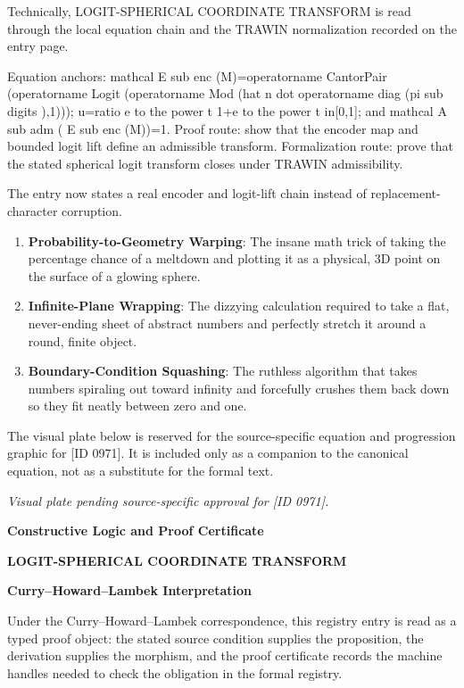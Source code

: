 Technically, LOGIT-SPHERICAL COORDINATE TRANSFORM is read through the local equation chain and the TRAWIN normalization recorded on the entry page.

Equation anchors: mathcal E sub enc (M)=operatorname CantorPair (operatorname Logit (operatorname Mod (hat n dot operatorname diag (pi sub digits ),1))); u=ratio e to the power t 1+e to the power t in[0,1]; and mathcal A sub adm ( E sub enc (M))=1. Proof route: show that the encoder map and bounded logit lift define an admissible transform. Formalization route: prove that the stated spherical logit transform closes under TRAWIN admissibility.

The entry now states a real encoder and logit-lift chain instead of replacement-character corruption.
\endgroup

\begin{enumerate}[leftmargin=1.6em,itemsep=6pt,topsep=4pt]
\item \textbf{Probability-to-Geometry Warping}: The insane math trick of taking the percentage chance of a meltdown and plotting it as a physical, 3D point on the surface of a glowing sphere.
\item \textbf{Infinite-Plane Wrapping}: The dizzying calculation required to take a flat, never-ending sheet of abstract numbers and perfectly stretch it around a round, finite object.
\item \textbf{Boundary-Condition Squashing}: The ruthless algorithm that takes numbers spiraling out toward infinity and forcefully crushes them back down so they fit neatly between zero and one.
\end{enumerate}

\begingroup\footnotesize\sloppy
The visual plate below is reserved for the source-specific equation and progression graphic for [ID 0971]. It is included only as a companion to the canonical equation, not as a substitute for the formal text.
\par\endgroup
\begingroup\footnotesize\itshape
Visual plate pending source-specific approval for [ID 0971].
\par\endgroup

\clearpage
\begingroup\tzpsupportsetup
\noindent\textbf{\fontsize{10.8pt}{12.8pt}\selectfont [ID 0971] Constructive Logic and Proof Certificate}\par
\noindent\textbf{\fontsize{10pt}{12pt}\selectfont LOGIT-SPHERICAL COORDINATE TRANSFORM}\par
\vspace{0.45em}
\begingroup
\footnotesize
\setlength{\parskip}{0.22em}
\setlength{\parindent}{0pt}
\noindent\textbf{Curry--Howard--Lambek Interpretation}\par
Under the Curry--Howard--Lambek correspondence, this registry entry is read as a typed proof
object: the stated source condition supplies the proposition, the derivation supplies the
morphism, and the proof certificate records the machine handles needed to check the obligation
in the formal registry.

